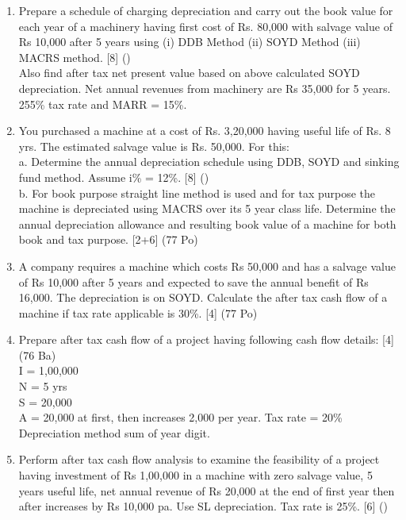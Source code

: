 \documentclass[12pt]{article}
\begin{document}
\begin{enumerate}
			\item Prepare a schedule of charging depreciation and carry out the book value for each year of a machinery having first cost of Rs. 80,000 with salvage value of Rs 10,000 after 5 years using (i) DDB Method (ii) SOYD Method (iii) MACRS method. \hfill [8] ()\\
			Also find after tax net present value based on above calculated SOYD depreciation. Net annual revenues from machinery are Rs 35,000 for 5 years. 255\% tax rate and MARR = 15\%.

			\item You purchased a machine at a cost of Rs. 3,20,000 having useful life of Rs. 8 yrs. The estimated salvage value is Rs. 50,000. For this:\\[2pt]
			a. Determine the annual depreciation schedule using DDB, SOYD and sinking fund method. Assume i\% = 12\%. \hfill [8] ()\\[1pt]
			b. For book purpose straight line method is used and for tax purpose the machine is depreciated using MACRS over its 5 year class life. Determine the annual depreciation allowance and resulting book value of a machine for both book and tax purpose. \hfill [2+6] (77 Po)

			\item A company requires a machine which costs Rs 50,000 and has a salvage value of Rs 10,000 after 5 years and expected to save the annual benefit of Rs 16,000. The depreciation is on SOYD. Calculate the after tax cash flow of a machine if tax rate applicable is 30\%. \hfill [4] (77 Po)

			\item Prepare after tax cash flow of a project having following cash flow details: \hfill [4] (76 Ba)\\
			I = 1,00,000\\
			N = 5 yrs\\
			S = 20,000\\
			A = 20,000 at first, then increases 2,000 per year.
			Tax rate = 20\%
			Depreciation method sum of year digit.

			\item Perform after tax cash flow analysis to examine the feasibility of a project having investment of Rs 1,00,000 in a machine with zero salvage value, 5 years useful life, net annual revenue of Rs 20,000 at the end of first year then after increases by Rs 10,000 pa. Use SL depreciation. Tax rate is 25\%. \hfill [6] ()


\end{enumerate}
\end{document}
